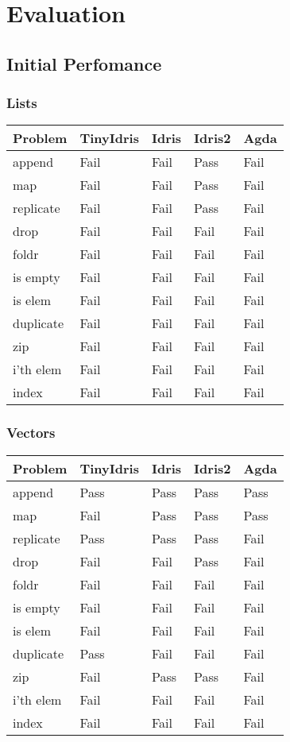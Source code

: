 \documentclass[a4paper]{article}
\begin{document}
\clearpage

\section{Evaluation}
\label{sec:org2fc5750}
\subsection{Initial Perfomance}
\label{sec:org9ac3710}

\subsubsection{Lists}
\label{sec:org840f301}
\begin{center}
\begin{tabular}{lllll}
Problem & TinyIdris & Idris & Idris2 & Agda\\
\hline
append & Fail & Fail & Pass & Fail\\
map & Fail & Fail & Pass & Fail\\
replicate & Fail & Fail & Pass & Fail\\
drop & Fail & Fail & Fail & Fail\\
foldr & Fail & Fail & Fail & Fail\\
is empty & Fail & Fail & Fail & Fail\\
is elem & Fail & Fail & Fail & Fail\\
duplicate & Fail & Fail & Fail & Fail\\
zip & Fail & Fail & Fail & Fail\\
i'th elem & Fail & Fail & Fail & Fail\\
index & Fail & Fail & Fail & Fail\\
\end{tabular}
\end{center}

\subsubsection{Vectors}
\label{sec:org20404d1}
\begin{center}
\begin{tabular}{lllll}
Problem & TinyIdris & Idris & Idris2 & Agda\\
\hline
append & Pass & Pass & Pass & Pass\\
map & Fail & Pass & Pass & Pass\\
replicate & Pass & Pass & Pass & Fail\\
drop & Fail & Fail & Pass & Fail\\
foldr & Fail & Fail & Fail & Fail\\
is empty & Fail & Fail & Fail & Fail\\
is elem & Fail & Fail & Fail & Fail\\
duplicate & Pass & Fail & Fail & Fail\\
zip & Fail & Pass & Pass & Fail\\
i'th elem & Fail & Fail & Fail & Fail\\
index & Fail & Fail & Fail & Fail\\
\end{tabular}
\end{center}
\end{document}
